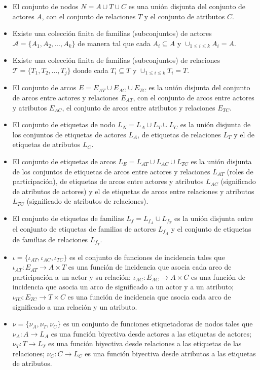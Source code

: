 \begin{defn}
  \begin{itemize}
    \item El conjunto de nodos $N = A \cup T \cup C$ es una unión disjunta del conjunto de actores $A$, con el conjunto de relaciones $T$ y el conjunto de atributos $C$.
    \item Existe una colección finita de familias (subconjuntos) de actores $\mathcal{A} = \{ A_1, A_2, \dotsc, A_k \}$ de manera tal que cada $A_i \subseteq A$ y $\cup_{1 \leq i \leq k}A_i = A$.
    \item Existe una colección finita de familias (subconjuntos) de relaciones $\mathcal{T} = \{ T_1, T_2, \dotsc, T_j \}$ donde cada $T_i \subseteq T$ y $\cup_{1 \leq i \leq k}T_i = T$.
    \item El conjunto de arcos $E = E_{AT} \cup E_{AC} \cup E_{TC}$ es la unión disjunta del conjunto de arcos entre actores y relaciones $E_{AT}$, con el conjunto de arcos entre actores y atributos $E_{AC}$, el conjunto de arcos entre atributos y relaciones $E_{TC}$.
    \item El conjunto de etiquetas de nodo $L_N = L_A \cup L_T \cup L_C$ es la unión disjunta de los conjuntos de etiquetas de actores $L_A$, de etiquetas de relaciones $L_T$ y el de etiquetas de atributos $L_C$.
    \item El conjunto de etiquetas de arcos $L_E = L_{AT} \cup L_{AC} \cup L_{TC}$ es la unión disjunta de los conjuntos de etiquetas de arcos entre actores y relaciones $L_{AT}$ (roles de participación), de etiquetas de arcos entre actores y atributos $L_{AC}$ (significado de atributos de actores) y el de etiquetas de arcos entre relaciones y atributos $L_{TC}$ (significado de atributos de relaciones).
    \item El conjunto de etiquetas de familias $L_f = L_{f_A} \cup L_{f_T}$ es la unión disjunta entre el conjunto de etiquetas de familias de actores $L_{f_A}$ y el conjunto de etiquetas de familias de relaciones $L_{f_T}$.
    \item $\iota = \{ \iota_{AT} , \iota_{AC} , \iota_{TC} \}$ es el conjunto de funciones de incidencia tales que $ \iota_{AT} : E_{AT} \longrightarrow A \times T$ es una función de incidencia que asocia cada arco de participación a un actor y su relación; $ \iota_{AC} : E_{AC} \longrightarrow A \times C$ es una función de incidencia que asocia un arco de significado a un actor y a un atributo; $ \iota_{TC} : E_{TC} \longrightarrow T \times C$ es una función de incidencia que asocia cada arco de significado a una relación y un atributo.
    \item $\nu = \{ \nu_A , \nu_T , \nu_C \}$ es un conjunto de funciones etiquetadoras de nodos tales que $ \nu_A : A \longrightarrow L_A$ es una función biyectiva desde actores a las etiquetas de actores; $ \nu_T : T \longrightarrow L_T$ es una función biyectiva desde relaciones a las etiquetas de las relaciones; $ \nu_C : C \longrightarrow L_C$ es una función biyectiva desde atributos a las etiquetas de atributos.

\end{itemize}
\end{defn}
